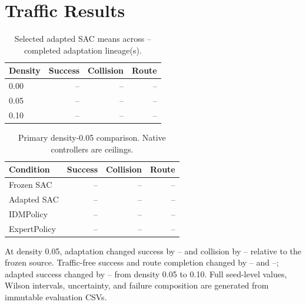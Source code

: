 \documentclass[10pt,twocolumn]{article}
\newcommand{\TrafficSuccessZero}{--}
\newcommand{\TrafficSuccessPrimary}{--}
\newcommand{\TrafficSuccessStress}{--}
\newcommand{\TrafficCollisionZero}{--}
\newcommand{\TrafficCollisionPrimary}{--}
\newcommand{\TrafficCollisionStress}{--}
\newcommand{\TrafficRouteZero}{--}
\newcommand{\TrafficRoutePrimary}{--}
\newcommand{\TrafficRouteStress}{--}
\newcommand{\TrafficPrimaryGain}{--}
\newcommand{\TrafficPrimaryCollisionChange}{--}
\newcommand{\TrafficFreeSuccessChange}{--}
\newcommand{\TrafficFreeRouteChange}{--}
\newcommand{\TrafficStressSuccessChange}{--}
\newcommand{\TrafficSourceSuccessPrimary}{--}
\newcommand{\TrafficSourceCollisionPrimary}{--}
\newcommand{\TrafficSourceRoutePrimary}{--}
\newcommand{\TrafficIdmSuccessPrimary}{--}
\newcommand{\TrafficIdmCollisionPrimary}{--}
\newcommand{\TrafficIdmRoutePrimary}{--}
\newcommand{\TrafficExpertSuccessPrimary}{--}
\newcommand{\TrafficExpertCollisionPrimary}{--}
\newcommand{\TrafficExpertRoutePrimary}{--}
\newcommand{\TrafficAdaptedSeedCount}{--}
\newif\iftrafficresults
\begin{document}
\section{Traffic Results}
\iftrafficresults
\begin{table}[t]
\centering
\caption{Selected adapted SAC means across \TrafficAdaptedSeedCount{} completed
adaptation lineage(s).}
\label{tab:traffic}
\begin{tabular}{lrrr}
\toprule
Density & Success & Collision & Route \\
\midrule
0.00 & \TrafficSuccessZero & \TrafficCollisionZero & \TrafficRouteZero \\
0.05 & \TrafficSuccessPrimary & \TrafficCollisionPrimary & \TrafficRoutePrimary \\
0.10 & \TrafficSuccessStress & \TrafficCollisionStress & \TrafficRouteStress \\
\bottomrule
\end{tabular}
\end{table}

\begin{table}[t]
\centering
\caption{Primary density-0.05 comparison. Native controllers are ceilings.}
\label{tab:primary}
\begin{tabular}{lrrr}
\toprule
Condition & Success & Collision & Route \\
\midrule
Frozen SAC & \TrafficSourceSuccessPrimary & \TrafficSourceCollisionPrimary &
\TrafficSourceRoutePrimary \\
Adapted SAC & \TrafficSuccessPrimary & \TrafficCollisionPrimary &
\TrafficRoutePrimary \\
IDMPolicy & \TrafficIdmSuccessPrimary & \TrafficIdmCollisionPrimary &
\TrafficIdmRoutePrimary \\
ExpertPolicy & \TrafficExpertSuccessPrimary & \TrafficExpertCollisionPrimary &
\TrafficExpertRoutePrimary \\
\bottomrule
\end{tabular}
\end{table}

At density 0.05, adaptation changed success by \TrafficPrimaryGain{} and collision by
\TrafficPrimaryCollisionChange{} relative to the frozen source. Traffic-free success and
route completion changed by \TrafficFreeSuccessChange{} and \TrafficFreeRouteChange{};
adapted success changed by \TrafficStressSuccessChange{} from density 0.05 to 0.10.
Full seed-level values, Wilson intervals, uncertainty, and failure composition are
generated from immutable evaluation CSVs.
\end{document}
